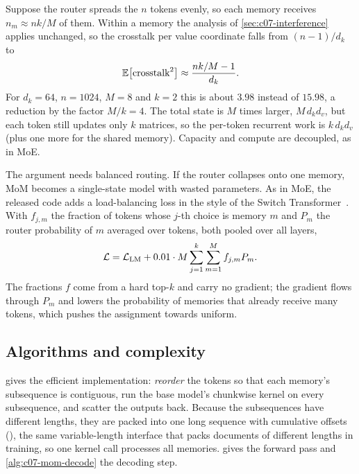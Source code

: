 Suppose the router spreads the $n$ tokens evenly, so each memory receives $n_m \approx nk/M$
of them. Within a memory the analysis of \cref{sec:c07-interference} applies unchanged, so
the crosstalk per value coordinate falls from $(n-1)/d_k$ to
\begin{equation}\label{eq:c07-mom-crosstalk}
  \mathbb{E}\bigl[\text{crosstalk}^2\bigr] \approx \frac{nk/M - 1}{d_k}.
\end{equation}
For $d_k = 64$, $n = 1024$, $M = 8$ and $k = 2$ this is about $3.98$ instead of $15.98$, a
reduction by the factor $M/k = 4$. The total state is $M$ times larger, $M\,d_kd_v$, but each
token still updates only $k$ matrices, so the per-token recurrent work is $k\,d_kd_v$ (plus one
more for the shared memory). Capacity and compute are decoupled, as in MoE.

The argument needs balanced routing. If the router collapses onto one memory, MoM becomes a
single-state model with wasted parameters. As in MoE, the released code adds a load-balancing
loss in the style of the Switch Transformer~\citep{fedus2022switch}. With $f_{j,m}$ the
fraction of tokens whose $j$-th choice is memory $m$ and $P_m$ the router probability of $m$
averaged over tokens, both pooled over all layers,
\begin{equation}\label{eq:c07-mom-aux}
  \mathcal{L} = \mathcal{L}_{\mathrm{LM}} + 0.01\cdot M\sum_{j=1}^{k}\sum_{m=1}^{M} f_{j,m}P_m .
\end{equation}
The fractions $f$ come from a hard top-$k$ and carry no gradient; the gradient flows through
$P_m$ and lowers the probability of memories that already receive many tokens, which pushes
the assignment towards uniform.

\subsection{Algorithms and complexity}\label{sec:c07-mom-alg}

 gives the efficient implementation: \emph{reorder} the tokens so that
each memory's subsequence is contiguous, run the base model's chunkwise kernel on every
subsequence, and scatter the outputs back. Because the subsequences have different
lengths, they are packed into one long sequence with cumulative offsets (), the
same variable-length interface that packs documents of different lengths in training, so one
kernel call processes all memories.  gives the forward pass and
\cref{alg:c07-mom-decode} the decoding step.

